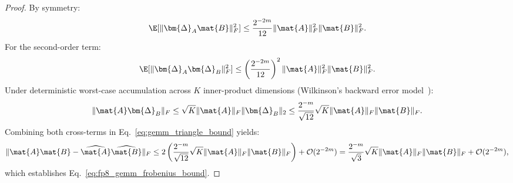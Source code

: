 \begin{proof}
By symmetry:
\begin{equation}
\E[\|\bm{\Delta}_A\mat{B}\|_F^2] \le \frac{2^{-2m}}{12} \|\mat{A}\|_F^2 \|\mat{B}\|_F^2.
\end{equation}
For the second-order term:
\begin{equation}
\E[\|\bm{\Delta}_A\bm{\Delta}_B\|_F^2] \le \left(\frac{2^{-2m}}{12}\right)^2 \|\mat{A}\|_F^2 \|\mat{B}\|_F^2.
\end{equation}
Under deterministic worst-case accumulation across $K$ inner-product dimensions (Wilkinson's backward error model~\cite{higham2002accuracy}):
\begin{equation}
\|\mat{A}\bm{\Delta}_B\|_F \le \sqrt{K} \|\mat{A}\|_F \|\bm{\Delta}_B\|_2 \le \frac{2^{-m}}{\sqrt{12}} \sqrt{K} \|\mat{A}\|_F \|\mat{B}\|_F.
\end{equation}
Combining both cross-terms in Eq.~\eqref{eq:gemm_triangle_bound} yields:
\begin{equation}
\|\mat{A} \mat{B} - \widehat{\mat{A}} \widehat{\mat{B}}\|_F \le 2 \left( \frac{2^{-m}}{\sqrt{12}} \sqrt{K} \|\mat{A}\|_F \|\mat{B}\|_F \right) + \mathcal{O}(2^{-2m}) = \frac{2^{-m}}{\sqrt{3}} \sqrt{K} \|\mat{A}\|_F \|\mat{B}\|_F + \mathcal{O}(2^{-2m}),
\end{equation}
which establishes Eq.~\eqref{eq:fp8_gemm_frobenius_bound}.


\end{proof}
